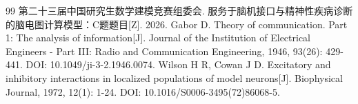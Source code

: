 \documentclass[12pt,a4paper]{article}
\renewcommand{\refname}{参考文献}
\begin{document}


\renewcommand{\refname}{参考文献}
\begin{thebibliography}{99}
\setlength{\itemsep}{2pt}
 第二十三届中国研究生数学建模竞赛组委会. 服务于脑机接口与精神性疾病诊断的脑电图计算模型：C题题目[Z]. 2026.
 Gabor D. Theory of communication. Part 1: The analysis of information[J]. Journal of the Institution of Electrical Engineers - Part III: Radio and Communication Engineering, 1946, 93(26): 429-441. DOI: 10.1049/ji-3-2.1946.0074.
 Wilson H R, Cowan J D. Excitatory and inhibitory interactions in localized populations of model neurons[J]. Biophysical Journal, 1972, 12(1): 1-24. DOI: 10.1016/S0006-3495(72)86068-5.
\end{thebibliography}
\end{document}
